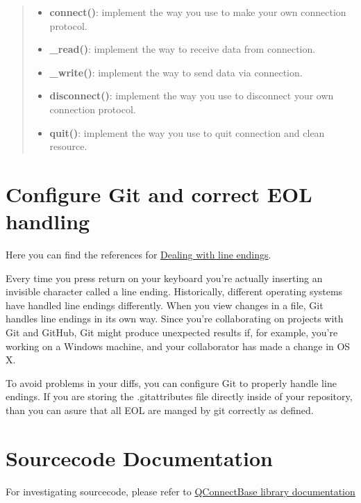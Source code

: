 \begin{quote}
\begin{itemize}
\tightlist
\item
  \textbf{connect()}: implement the way you use to make your own
  connection protocol.
\item
  \textbf{\_read()}: implement the way to receive data from connection.
\item
  \textbf{\_write()}: implement the way to send data via connection.
\item
  \textbf{disconnect()}: implement the way you use to disconnect your
  own connection protocol.
\item
  \textbf{quit()}: implement the way you use to quit connection and
  clean resource.
\end{itemize}
\end{quote}

\hypertarget{description-configure-git-and-correct-eol-handling}{%
\section{Configure Git and correct EOL
handling}\label{description-configure-git-and-correct-eol-handling}}

Here you can find the references for
\href{https://help.github.com/articles/dealing-with-line-endings/}{Dealing
with line endings}.

Every time you press return on your keyboard you're actually inserting
an invisible character called a line ending. Historically, different
operating systems have handled line endings differently. When you view
changes in a file, Git handles line endings in its own way. Since you're
collaborating on projects with Git and GitHub, Git might produce
unexpected results if, for example, you're working on a Windows machine,
and your collaborator has made a change in OS X.

To avoid problems in your diffs, you can configure Git to properly
handle line endings. If you are storing the .gitattributes file directly
inside of your repository, than you can asure that all EOL are manged by
git correctly as defined.

\hypertarget{description-sourcecode-documentation}{%
\section{Sourcecode Documentation}\label{description-sourcecode-documentation}}

For investigating sourcecode, please refer to
\href{../docs/html/index.html}{QConnectBase library documentation}

